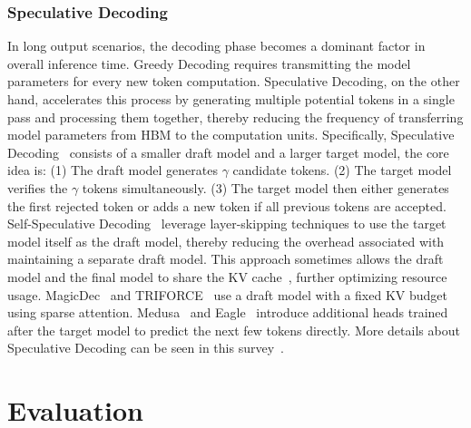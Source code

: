 \documentclass[11pt, a4paper, logo, copyright, nonumbering]{map}
\begin{document}
\subsubsection{Speculative Decoding}
In long output scenarios, the decoding phase becomes a dominant factor in overall inference time. Greedy Decoding requires transmitting the model parameters for every new token computation. Speculative Decoding, on the other hand, accelerates this process by generating multiple potential tokens in a single pass and processing them together, thereby reducing the frequency of transferring model parameters from HBM to the computation units. Specifically, Speculative Decoding~\citep{leviathan2023fast} consists of a smaller draft model and a larger target model, the core idea is: (1) The draft model generates $\gamma$ candidate tokens. (2) The target model verifies the $\gamma$ tokens simultaneously. (3) The target model then either generates the first rejected token or adds a new token if all previous tokens are accepted.
Self-Speculative Decoding~\citep{hooper2023speed,zhang-etal-2024-draft,elhoushi-etal-2024-layerskip} leverage layer-skipping techniques to use the target model itself as the draft model, thereby reducing the overhead associated with maintaining a separate draft model. This approach sometimes allows the draft model and the final model to share the KV cache~\citep{elhoushi-etal-2024-layerskip}, further optimizing resource usage. MagicDec~\citep{chen2024magicdec} and TRIFORCE~\citep{suntriforce} use a draft model with a fixed KV budget using 
sparse attention. Medusa~\citep{cai2024medusa} and Eagle~\citep{li2024eagle} introduce additional heads trained after the target model to predict the next few tokens directly. More details about Speculative Decoding can be seen in this survey~\citep{xia2024unlocking}.



\section{Evaluation}
\label{sec:evaluation}

\newcommand{\ColoredFiveStar}[1]{\textcolor{#1}{\raisebox{-2pt}{\FiveStar}}}
\newcommand{\ColoredBlock}[1]{\textcolor{#1}{$\blacksquare$}}

\newcommand{\boxedR}[2][]{%
    \begin{tikzpicture}[baseline=(char.base)]
        \node[draw,rectangle,rounded corners=2pt,scale=0.8,inner sep=2pt,#1] (char) {#2};
    \end{tikzpicture}}
\end{document}
